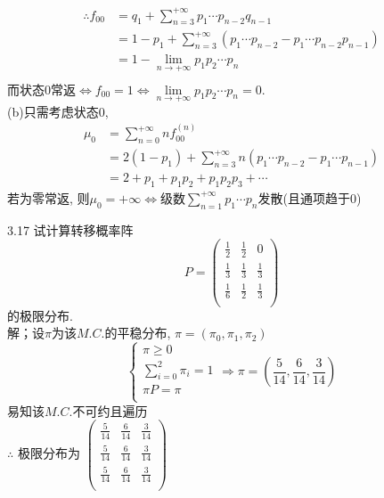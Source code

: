 \[
\begin{split}
\therefore f_{00} & = q_1 + \sum^{+\infty}_{n=3}p_1\cdots p_{n-2}q_{n-1}\\
				& = 1 - p_1 + \sum^{+\infty}_{n=3}(p_1\cdots p_{n-2} - p_1\cdots p_{n-2}p_{n-1})\\
				& = 1 - \lim_{n\rightarrow +\infty}p_1p_2\cdots p_n\\
\end{split}
\]
而状态$0$常返$\Leftrightarrow f_{00} = 1 \Leftrightarrow \lim\limits_{n\rightarrow +\infty}p_1p_2\cdots p_n = 0$.\\
(b)只需考虑状态$0$,
\[
\begin{split}
\mu_0 & = \sum^{+\infty}_{n=0}nf^{(n)}_{00}\\
	& = 2(1-p_1)+\sum^{+\infty}_{n=3}n(p_1\cdots p_{n-2} - p_1\cdots p_{n-1})\\
	& = 2 + p_1 + p_1p_2 + p_1p_2p_3 + \cdots
\end{split}
\]
若为零常返, 则$\mu_0 = +\infty \Leftrightarrow $级数$\sum\limits^{+\infty}_{n=1}p_1\cdots p_n$发散(且通项趋于$0$)


3.17 试计算转移概率阵
\[
P =
\begin{pmatrix}
	\frac{1}{2} & \frac{1}{2} & 0\\
	\frac{1}{3} & \frac{1}{3} & \frac{1}{3}\\
	\frac{1}{6} & \frac{1}{2} & \frac{1}{3}\\
\end{pmatrix}
\]
的极限分布.\\
解；设$\pi$为该$M.C.$的平稳分布, $\pi = (\pi_0, \pi_1, \pi_2)$\\
\[
\begin{cases}
\pi \geqslant 0\\
\sum\limits^2_{i=0} \pi_i = 1\\
\pi P = \pi\\
\end{cases}
\Rightarrow
\pi = (\frac{5}{14}, \frac{6}{14}, \frac{3}{14})
\]
易知该$M.C.$不可约且遍历\\
$\therefore$ 极限分布为
$
\begin{pmatrix}
	\frac{5}{14} & \frac{6}{14} & \frac{3}{14}\\
	\frac{5}{14} & \frac{6}{14} & \frac{3}{14}\\
	\frac{5}{14} & \frac{6}{14} & \frac{3}{14}\\
\end{pmatrix}
$


